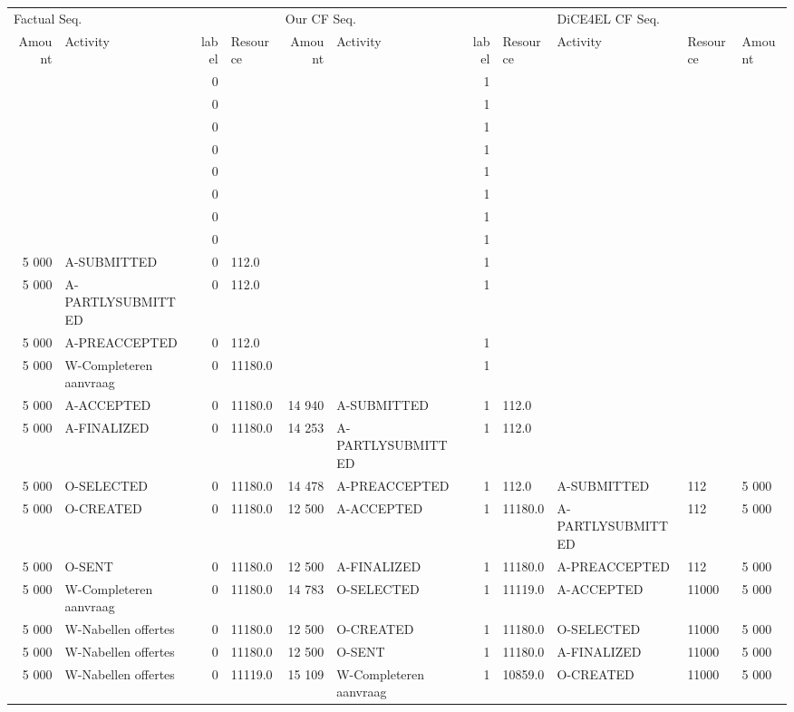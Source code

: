 \begin{tabular}{rlrlrlrllll}
\toprule
\multicolumn{4}{l}{Factual Seq.} & \multicolumn{4}{l}{Our CF Seq.} & \multicolumn{3}{l}{DiCE4EL CF Seq.} \\
Amount & Activity & label & Resource & Amount & Activity & label & Resource & Activity & Resource & Amount \\
\midrule
 &  & 0 &  &  &  & 1 &  &  &  &  \\
 &  & 0 &  &  &  & 1 &  &  &  &  \\
 &  & 0 &  &  &  & 1 &  &  &  &  \\
 &  & 0 &  &  &  & 1 &  &  &  &  \\
 &  & 0 &  &  &  & 1 &  &  &  &  \\
 &  & 0 &  &  &  & 1 &  &  &  &  \\
 &  & 0 &  &  &  & 1 &  &  &  &  \\
 &  & 0 &  &  &  & 1 &  &  &  &  \\
5 000 & A-SUBMITTED & 0 & 112.0 &  &  & 1 &  &  &  &  \\
5 000 & A-PARTLYSUBMITTED & 0 & 112.0 &  &  & 1 &  &  &  &  \\
5 000 & A-PREACCEPTED & 0 & 112.0 &  &  & 1 &  &  &  &  \\
5 000 & W-Completeren aanvraag & 0 & 11180.0 &  &  & 1 &  &  &  &  \\
5 000 & A-ACCEPTED & 0 & 11180.0 & 14 940 & A-SUBMITTED & 1 & 112.0 &  &  &  \\
5 000 & A-FINALIZED & 0 & 11180.0 & 14 253 & A-PARTLYSUBMITTED & 1 & 112.0 &  &  &  \\
5 000 & O-SELECTED & 0 & 11180.0 & 14 478 & A-PREACCEPTED & 1 & 112.0 & A-SUBMITTED & 112 & 5 000 \\
5 000 & O-CREATED & 0 & 11180.0 & 12 500 & A-ACCEPTED & 1 & 11180.0 & A-PARTLYSUBMITTED & 112 & 5 000 \\
5 000 & O-SENT & 0 & 11180.0 & 12 500 & A-FINALIZED & 1 & 11180.0 & A-PREACCEPTED & 112 & 5 000 \\
5 000 & W-Completeren aanvraag & 0 & 11180.0 & 14 783 & O-SELECTED & 1 & 11119.0 & A-ACCEPTED & 11000 & 5 000 \\
5 000 & W-Nabellen offertes & 0 & 11180.0 & 12 500 & O-CREATED & 1 & 11180.0 & O-SELECTED & 11000 & 5 000 \\
5 000 & W-Nabellen offertes & 0 & 11180.0 & 12 500 & O-SENT & 1 & 11180.0 & A-FINALIZED & 11000 & 5 000 \\
5 000 & W-Nabellen offertes & 0 & 11119.0 & 15 109 & W-Completeren aanvraag & 1 & 10859.0 & O-CREATED & 11000 & 5 000 \\

\end{tabular}
